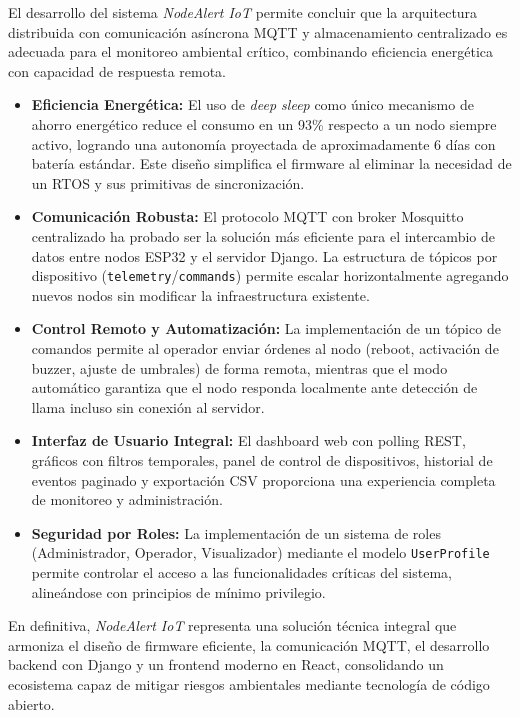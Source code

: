 \documentclass[11pt,a4paper]{article}
\begin{document}
El desarrollo del sistema \textit{NodeAlert IoT} permite concluir que la arquitectura distribuida con comunicación asíncrona MQTT y almacenamiento centralizado es adecuada para el monitoreo ambiental crítico, combinando eficiencia energética con capacidad de respuesta remota.

\begin{itemize}
    \item \textbf{Eficiencia Energética:} El uso de \textit{deep sleep} como único mecanismo de ahorro energético reduce el consumo en un 93\% respecto a un nodo siempre activo, logrando una autonomía proyectada de aproximadamente 6 días con batería estándar. Este diseño simplifica el firmware al eliminar la necesidad de un RTOS y sus primitivas de sincronización.
    \item \textbf{Comunicación Robusta:} El protocolo MQTT con broker Mosquitto centralizado ha probado ser la solución más eficiente para el intercambio de datos entre nodos ESP32 y el servidor Django. La estructura de tópicos por dispositivo (\texttt{telemetry}/\texttt{commands}) permite escalar horizontalmente agregando nuevos nodos sin modificar la infraestructura existente.
    \item \textbf{Control Remoto y Automatización:} La implementación de un tópico de comandos permite al operador enviar órdenes al nodo (reboot, activación de buzzer, ajuste de umbrales) de forma remota, mientras que el modo automático garantiza que el nodo responda localmente ante detección de llama incluso sin conexión al servidor.
    \item \textbf{Interfaz de Usuario Integral:} El dashboard web con polling REST, gráficos con filtros temporales, panel de control de dispositivos, historial de eventos paginado y exportación CSV proporciona una experiencia completa de monitoreo y administración.
    \item \textbf{Seguridad por Roles:} La implementación de un sistema de roles (Administrador, Operador, Visualizador) mediante el modelo \texttt{UserProfile} permite controlar el acceso a las funcionalidades críticas del sistema, alineándose con principios de mínimo privilegio.
\end{itemize}

En definitiva, \textit{NodeAlert IoT} representa una solución técnica integral que armoniza el diseño de firmware eficiente, la comunicación MQTT, el desarrollo backend con Django y un frontend moderno en React, consolidando un ecosistema capaz de mitigar riesgos ambientales mediante tecnología de código abierto.
\end{document}
